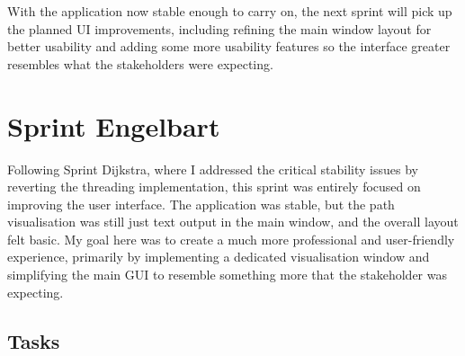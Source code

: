 With the application now stable enough to carry on, the next sprint will pick up the planned UI improvements, including refining the main window layout for better usability and adding some more usability features so the interface greater resembles what the stakeholders were expecting.

\newpage

\section{Sprint Engelbart}

Following Sprint Dijkstra, where I addressed the critical stability issues by reverting the threading implementation, this sprint was entirely focused on improving the user interface. The application was stable, but the path visualisation was still just text output in the main window, and the overall layout felt basic. My goal here was to create a much more professional and user-friendly experience, primarily by implementing a dedicated visualisation window and simplifying the main GUI to resemble something more that the stakeholder was expecting.

\subsection{Tasks}

